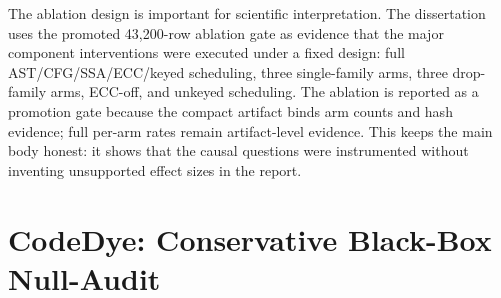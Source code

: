 The ablation design is important for scientific interpretation. The dissertation uses the promoted 43,200-row ablation gate as evidence that the major component interventions were executed under a fixed design: full AST/CFG/SSA/ECC/keyed scheduling, three single-family arms, three drop-family arms, ECC-off, and unkeyed scheduling. The ablation is reported as a promotion gate because the compact artifact binds arm counts and hash evidence; full per-arm rates remain artifact-level evidence. This keeps the main body honest: it shows that the causal questions were instrumented without inventing unsupported effect sizes in the report.

\section{CodeDye: Conservative Black-Box Null-Audit}

